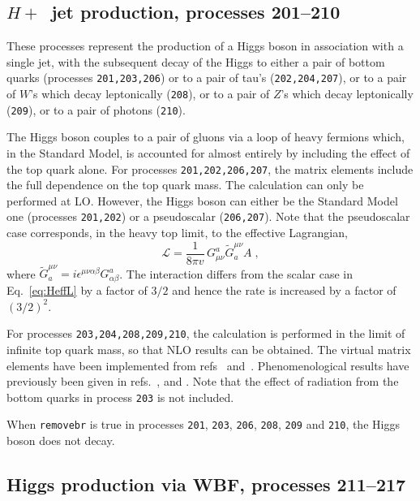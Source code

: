\documentclass{article}
\begin{document}
{{{{{{\subsection{$H+$~jet production, processes 201--210}
\label{subsec:hjet}

These processes represent the production of a Higgs boson in association
with a single jet, with the subsequent decay of the Higgs to either
a pair of bottom quarks (processes {\tt 201,203,206}) 
or to a pair of tau's ({\tt 202,204,207}),
or to a pair of $W$'s which decay leptonically ({\tt 208}),
or to a pair of $Z$'s which decay leptonically ({\tt 209}),
or to a pair of photons ({\tt 210}).

The Higgs boson couples to a pair of gluons via a loop of heavy fermions
which, in the Standard Model, is accounted for almost entirely by including
the effect of the top quark alone. For processes {\tt 201,202,206,207}, the
matrix elements include the full dependence on the top quark mass.
The calculation can only be performed at LO. 
However, the Higgs boson can either be the Standard Model one
(processes {\tt 201,202}) or a pseudoscalar ({\tt 206,207}).
Note that the pseudoscalar case corresponds, in the heavy top limit, to the effective Lagrangian,
\begin{equation}
\mathcal{L} = \frac{1}{8\pi v} \, G^a_{\mu\nu} \widetilde G^{\mu\nu}_a A \;,
\end{equation}
where $\widetilde G^{\mu\nu}_a = i\epsilon^{\mu\nu\alpha\beta}
 G_{\alpha\beta}^a$.
The interaction differs from the scalar case in Eq.~{\ref{eq:HeffL}} by a factor of $3/2$
and hence the rate is increased by a factor of $(3/2)^2$.


For processes {\tt 203,204,208,209,210}, the calculation is performed in the
limit of infinite top quark mass, so that NLO results can be obtained.
The virtual matrix elements have been implemented from
refs~\cite{Ravindran:2002dc} and~\cite{Schmidt:1997wr}.
Phenomenological results have previously been 
given in refs.~\cite{deFlorian:1999zd},\cite{Ravindran:2002dc} 
and \cite{Glosser:2002gm}.
Note that the effect of radiation from the bottom quarks in process {\tt 203}
is not included.

When {\tt removebr} is true in processes {\tt 201}, {\tt 203}, {\tt 206}, {\tt 208}, {\tt 209}
and {\tt 210}, the Higgs boson does not decay.

\subsection{Higgs production via WBF, processes 211--217}
\label{subsec:wbf}

}}}}}}
\end{document}
